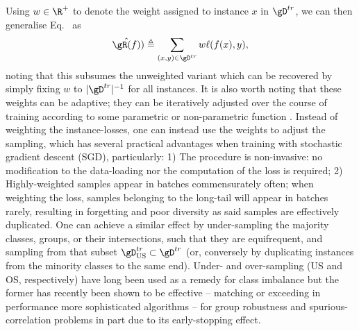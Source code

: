 %
Using \( w \in \R^+ \) to denote the weight assigned to instance \(x\) in \( \gD^{tr} \), we can
then generalise Eq.~\cite{eq:emp_risk} as
%
\equ\begin{equation*} \label{eq:emp_risk_weighted}
  \hat{\gR(f)}) \triangleq \sum_{(x, y) \in \gD^{tr}} w \ell (f(x), y),
\end{equation*}
%
noting that this subsumes the unweighted variant which can be recovered by simply fixing \(w\) to
\( |\gD^{tr}|^{-1} \) for all instances.
%
It is also worth noting that these weights can be adaptive; they can be iteratively
adjusted over the course of training according to some parametric or non-parametric function
\citep{wang2021importance}.
%
Instead of weighting the instance-losses, one can instead use the weights to adjust the sampling,
which has several practical advantages when training with stochastic gradient descent (SGD),
particularly: 
%
1) The procedure is non-invasive: no modification to the data-loading nor the
computation of the loss is required;
%
2) Highly-weighted samples appear in batches commensurately often; when weighting the loss, samples
belonging to the long-tail will appear in batches rarely, resulting in forgetting and poor
diversity as said samples are effectively duplicated.
%
One can achieve a similar effect by under-sampling the majority classes, groups, or their
intersections, such that they are equifrequent, and \iid{} sampling from that subset \(
\gD^{tr}_{\text{US}} \subset \gD^{tr} \) (or, conversely by duplicating instances from the minority
classes to the same end).
%
Under- and over-sampling (US and OS, respectively) have long been used as a remedy for class imbalance
\citep{chawla2002smote} but the former has recently been shown to be effective -- matching or
exceeding in performance more sophisticated algorithms -- for group robustness and
spurious-correlation problems \citep{sagawa2020investigation, idrissi2022simple} in part due to its
early-stopping effect.

